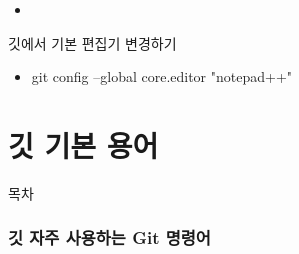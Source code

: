 \documentclass[aspectratio=1610,20pt,xcolor=pdftex,dvipsnames,table,handout]{beamer}
\begin{document}
		\begin{frame} [t,plain]

			\begin{block} {}
			\setlength{\leftmargini}{2em}			
			\begin{itemize}
				\item 
			\end{itemize}
			\end{block}						


		\end{frame}			

		\begin{frame} [t,plain]

			\begin{block} {깃에서 기본 편집기 변경하기}
			\setlength{\leftmargini}{2em}			
			\begin{itemize}
				\item git config --global core.editor "notepad++"
			\end{itemize}
			\end{block}						

		\end{frame}			





		\part{깃 기본 용어}
		\frame{\partpage}

\label{part1} 	%


		\begin{frame} [plain]{목차}
		\tableofcontents%
		\end{frame}



		\section{깃 자주 사용하는 Git 명령어}
\end{document}
